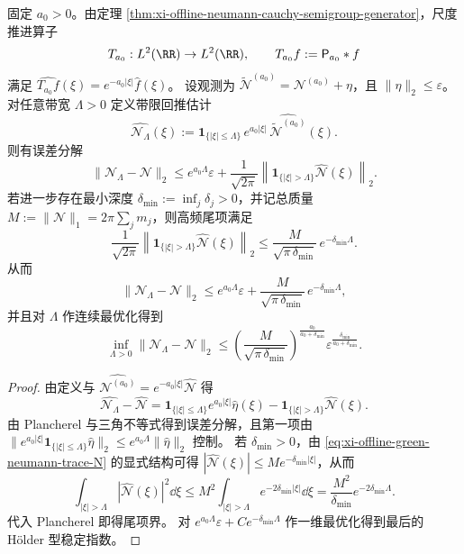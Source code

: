 \begin{theorem}\label{thm:xi-offline-neumann-bandlimited-backward-stability}
固定 \(a_0>0\)。由定理 \ref{thm:xi-offline-neumann-cauchy-semigroup-generator}，尺度推进算子
\[
T_{a_0}:L^2(\RR)\to L^2(\RR),\qquad T_{a_0}f:=\mathsf P_{a_0}*f
\]
满足 \(\widehat{T_{a_0}f}(\xi)=e^{-a_0|\xi|}\hat f(\xi)\)。
设观测为 \(\widetilde{\mathcal N}^{(a_0)}=\mathcal N^{(a_0)}+\eta\)，且 \(\|\eta\|_{2}\le\varepsilon\)。
对任意带宽 \(\Lambda>0\) 定义带限回推估计
\[
\widehat{\mathcal N_\Lambda}(\xi):=\mathbf 1_{\{|\xi|\le\Lambda\}}\,e^{a_0|\xi|}\,\widehat{\widetilde{\mathcal N}^{(a_0)}}(\xi).
\]
则有误差分解
\[
\|\mathcal N_\Lambda-\mathcal N\|_2
\le e^{a_0\Lambda}\varepsilon+\frac{1}{\sqrt{2\pi}}\left\|\mathbf 1_{\{|\xi|>\Lambda\}}\widehat{\mathcal N}(\xi)\right\|_2.
\]
若进一步存在最小深度 \(\delta_{\min}:=\inf_j\delta_j>0\)，并记总质量 \(M:=\|\mathcal N\|_{1}=2\pi\sum_j m_j\)，则高频尾项满足
\[
\frac{1}{\sqrt{2\pi}}\left\|\mathbf 1_{\{|\xi|>\Lambda\}}\widehat{\mathcal N}(\xi)\right\|_2
\le \frac{M}{\sqrt{\pi\,\delta_{\min}}}\,e^{-\delta_{\min}\Lambda}.
\]
从而
\[
\|\mathcal N_\Lambda-\mathcal N\|_2
\le e^{a_0\Lambda}\varepsilon+\frac{M}{\sqrt{\pi\,\delta_{\min}}}\,e^{-\delta_{\min}\Lambda},
\]
并且对 \(\Lambda\) 作连续最优化得到
\[
\inf_{\Lambda>0}\|\mathcal N_\Lambda-\mathcal N\|_2
\le
\left(\frac{M}{\sqrt{\pi\,\delta_{\min}}}\right)^{\frac{a_0}{a_0+\delta_{\min}}}
\varepsilon^{\frac{\delta_{\min}}{a_0+\delta_{\min}}}.
\]
\end{theorem}
\begin{proof}
由定义与 \(\widehat{\mathcal N^{(a_0)}}=e^{-a_0|\xi|}\widehat{\mathcal N}\) 得
\[
\widehat{\mathcal N_\Lambda}-\widehat{\mathcal N}
=\mathbf 1_{\{|\xi|\le\Lambda\}}e^{a_0|\xi|}\hat\eta(\xi)-\mathbf 1_{\{|\xi|>\Lambda\}}\widehat{\mathcal N}(\xi).
\]
由 Plancherel 与三角不等式得到误差分解，且第一项由 \(\|e^{a_0|\xi|}\mathbf 1_{\{|\xi|\le\Lambda\}}\hat\eta\|_2\le e^{a_0\Lambda}\|\hat\eta\|_2\) 控制。
若 \(\delta_{\min}>0\)，由 \eqref{eq:xi-offline-green-neumann-trace-N} 的显式结构可得
\(
|\widehat{\mathcal N}(\xi)|\le M e^{-\delta_{\min}|\xi|}
\)，从而
\[
\int_{|\xi|>\Lambda}|\widehat{\mathcal N}(\xi)|^2\dd\xi
\le M^2\int_{|\xi|>\Lambda}e^{-2\delta_{\min}|\xi|}\dd\xi
=\frac{M^2}{\delta_{\min}}e^{-2\delta_{\min}\Lambda}.
\]
代入 Plancherel 即得尾项界。
对 \(e^{a_0\Lambda}\varepsilon+Ce^{-\delta_{\min}\Lambda}\) 作一维最优化得到最后的 Hölder 型稳定指数。
\end{proof}

\endinput

